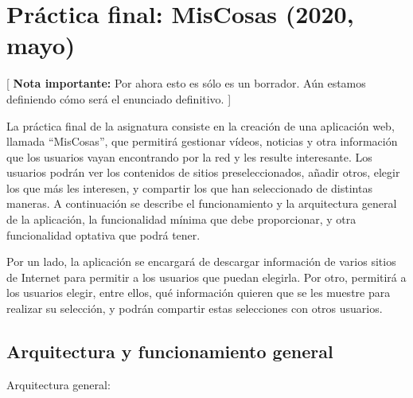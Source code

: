 \section{Práctica final: MisCosas (2020, mayo)}
\label{practica-final-2020-05}

[ \textbf{Nota importante:} Por ahora esto es sólo es un borrador. Aún estamos definiendo cómo será el enunciado definitivo. ]

La práctica final de la asignatura consiste en la creación de una aplicación web, llamada ``MisCosas'', que permitirá gestionar vídeos, noticias y otra información que los usuarios vayan encontrando por la red y les resulte interesante. Los usuarios podrán ver los contenidos de sitios preseleccionados, añadir otros, elegir los que más les interesen, y compartir los que han seleccionado de distintas maneras. A continuación se describe el funcionamiento y la arquitectura general de la aplicación, la funcionalidad mínima que debe proporcionar, y otra funcionalidad optativa que podrá tener.

Por un lado, la aplicación se encargará de descargar información de varios sitios de Internet para permitir a los usuarios que puedan elegirla. Por otro, permitirá a los usuarios elegir, entre ellos, qué información quieren que se les muestre para realizar su selección, y podrán compartir estas selecciones con otros usuarios.

\subsection{Arquitectura y funcionamiento general}

Arquitectura general:

